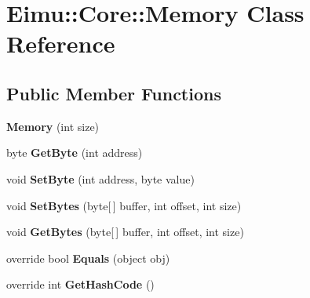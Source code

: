 \hypertarget{class_eimu_1_1_core_1_1_memory}{
\section{Eimu::Core::Memory Class Reference}
\label{class_eimu_1_1_core_1_1_memory}
}
\subsection*{Public Member Functions}
\begin{DoxyCompactItemize}
\item 
\hypertarget{class_eimu_1_1_core_1_1_memory_a25746318df0dedf314d89b7422daecca}{
{\bfseries Memory} (int size)}
\label{class_eimu_1_1_core_1_1_memory_a25746318df0dedf314d89b7422daecca}

\item 
\hypertarget{class_eimu_1_1_core_1_1_memory_a8a4fbf8d76149dfc8612b257ea05b19f}{
byte {\bfseries GetByte} (int address)}
\label{class_eimu_1_1_core_1_1_memory_a8a4fbf8d76149dfc8612b257ea05b19f}

\item 
\hypertarget{class_eimu_1_1_core_1_1_memory_ab16e45c01b8d38dcad05b3039ff71420}{
void {\bfseries SetByte} (int address, byte value)}
\label{class_eimu_1_1_core_1_1_memory_ab16e45c01b8d38dcad05b3039ff71420}

\item 
\hypertarget{class_eimu_1_1_core_1_1_memory_aa17d108cfb366cfb539fc711424ac281}{
void {\bfseries SetBytes} (byte\mbox{[}$\,$\mbox{]} buffer, int offset, int size)}
\label{class_eimu_1_1_core_1_1_memory_aa17d108cfb366cfb539fc711424ac281}

\item 
\hypertarget{class_eimu_1_1_core_1_1_memory_a89f240f005970bee1129b3e688c85c87}{
void {\bfseries GetBytes} (byte\mbox{[}$\,$\mbox{]} buffer, int offset, int size)}
\label{class_eimu_1_1_core_1_1_memory_a89f240f005970bee1129b3e688c85c87}

\item 
\hypertarget{class_eimu_1_1_core_1_1_memory_a105b8a12daa395a9844768011a171eef}{
override bool {\bfseries Equals} (object obj)}
\label{class_eimu_1_1_core_1_1_memory_a105b8a12daa395a9844768011a171eef}

\item 
\hypertarget{class_eimu_1_1_core_1_1_memory_a0778677ee2c43afe988b93e08dbdb50d}{
override int {\bfseries GetHashCode} ()}
\label{class_eimu_1_1_core_1_1_memory_a0778677ee2c43afe988b93e08dbdb50d}

\end{DoxyCompactItemize}
